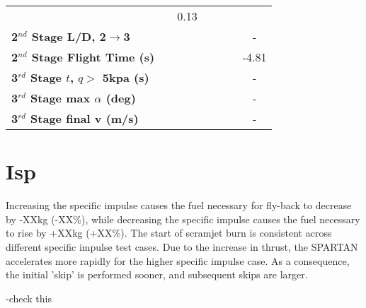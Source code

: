 \begin{table}[ht]
\begin{tabular}{l c c c c c c}
	& \secondthirdSeparationqqSixty
	&0.13
	\\
	\textbf{2$^{nd}$ Stage L/D, 2$\rightarrow$3}
	& \secondthirdSeparationLDqForty
	& \secondthirdSeparationLDqFortyFive
	& \secondthirdSeparationLDqStandard
	& \secondthirdSeparationLDqFiftyFive
	& \secondthirdSeparationLDqSixty
	& -
	\\
	\textbf{2$^{nd}$ Stage Flight Time (s)}
	& \secondFlightTimeqForty
	& \secondFlightTimeqFortyFive
	& \secondFlightTimeqStandard
	& \secondFlightTimeqFiftyFive
	& \secondFlightTimeqSixty
	&-4.81
	\\
	\textbf{3$^{rd}$ Stage $t$, $q >$ 5kpa (s)}
	& \thirdqOverFiveqForty
	& \thirdqOverFiveqFortyFive
	& \thirdqOverFiveqStandard
	& \thirdqOverFiveqFiftyFive
	& \thirdqOverFiveqSixty
	& -
	\\
	\textbf{3$^{rd}$ Stage max $\alpha$ (deg)}
	& \thirdmaxAoAqForty
	& \thirdmaxAoAqFortyFive
	& \thirdmaxAoAqStandard
	& \thirdmaxAoAqFiftyFive
	& \thirdmaxAoAqSixty
	& -
	\\
	\textbf{3$^{rd}$ Stage final v (m/s)}
	& \thirdcircvqForty
	& \thirdcircvqFortyFive
	& \thirdcircvqStandard
	& \thirdcircvqFiftyFive
	& \thirdcircvqSixty
	& -
	\\
	\hline 
\end{tabular} 
\end{table}


\section{Isp}


Increasing the specific impulse causes the fuel necessary for fly-back to decrease by -XXkg (-XX\%), while decreasing the specific impulse causes the fuel necessary to rise by +XXkg (+XX\%). The start of scramjet burn is consistent across different specific impulse test cases. Due to the increase in thrust, the SPARTAN accelerates more rapidly for the higher specific impulse case. As a consequence, the initial 'skip' is performed sooner, and subsequent skips are larger. 

-check this

